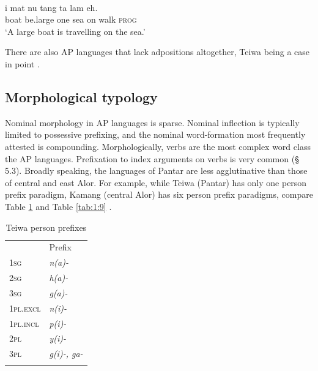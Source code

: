 \ea%
\label{ex:1:32}
\\
\gll 
{\textepsilon}i  mat{\textepsilon}  nu  tang  ta  lam{\textepsilon} eh.  \\
 boat  be.large  one  sea  on  walk  \textsc{prog}   \\
\glt `A large boat is travelling on the sea.'
\z

 
There are also AP languages that lack adpositions altogether, Teiwa being a case in point \citep{Klamer2010grammar}. 

\subsection{Morphological typology} \label{sec:1:5.7}
Nominal morphology in AP languages is sparse. Nominal inflection is typically limited to possessive prefixing, and the nominal word-formation most frequently attested is compounding. Morphologically, verbs are the most complex word class the AP languages. Prefixation to index arguments on verbs is very common ({\S} 5.3). Broadly speaking, the languages of Pantar are less agglutinative than those of central and east Alor. For example, while Teiwa (Pantar) has only one person prefix paradigm, Kamang (central Alor) has six person prefix paradigms, compare Table \ref{tab:1:8} and Table \ref{tab:1:9} \citep{FeddenEtAlTV}. 
 

\begin{table}\centering


\begin{tabular}{ll} & Prefix\\
\mytoprule
{\scshape 1sg} & {\itshape n(a)-}\\
{\scshape 2sg} & {\itshape h(a)-}\\
{\scshape 3sg} & {\itshape g(a)-}\\
{\scshape 1pl.excl} & {\itshape n(i)-}\\
{\scshape 1pl.incl} & {\itshape p(i)-}\\
{\scshape 2pl} & {\itshape y(i)-}\\
{\scshape 3pl} & {\itshape g(i)-, ga-}\\
\mybottomrule
\end{tabular}

\caption{Teiwa person prefixes \citep[77,78]{Klamer2010grammar}}
\label{tab:1:8}
\end{table}

 

